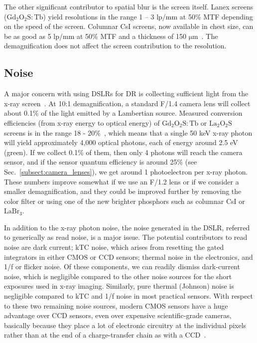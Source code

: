 The other significant contributor to spatial blur is the screen itself. Lanex screens ($\mathrm{Gd_2O_2S:Tb}$) yield resolutions in the range 1 – 3 lp/mm at 50\% MTF depending on the speed of the screen. Columnar CsI screens, now available in chest size, can be as good as 5 lp/mm at 50\% MTF and a thickness of 150 $\mathrm{\mu m}$~\citep{Nagarkar1997}. The demagnification does not affect the screen contribution to the resolution.

\subsection{Noise}
\label{subsect:noise}
A major concern with using DSLRs for DR is collecting sufficient light from the x-ray screen~\citep{Hejazi1997}. At 10:1 demagnification, a standard F/1.4 camera lens will collect about 0.1\% of the light emitted by a Lambertian source. Measured conversion efficiencies (from x-ray energy to optical energy) of $\mathrm{Gd_2O_2S:Tb}$ or $\mathrm{La_2O_2S}$ screens is in the range 18 - 20\%~\citep{Kandarakis2001}, which means that a single 50 keV x-ray photon will yield approximately 4,000 optical photons, each of energy around 2.5 eV (green). If we collect 0.1\% of them, then only 4 photons will reach the camera sensor, and if the sensor quantum efficiency is around 25\% (see Sec.~\ref{subsect:camera_lenses}), we get around 1 photoelectron per x-ray photon. These numbers improve somewhat if we use an F/1.2 lens or if we consider a smaller demagnification, and they could be improved further by removing the color filter or using one of the new brighter phosphors such as columnar CsI or $\mathrm{LaBr_3}$.

In addition to the x-ray photon noise, the noise generated in the DSLR, referred to generically as read noise, is a major issue. The potential contributors to read noise are dark current; kTC noise, which arises from resetting the gated integrators in either CMOS or CCD sensors; thermal noise in the electronics, and 1/f or flicker noise. Of these components, we can readily dismiss dark-current noise, which is negligible compared to the other noise sources for the short exposures used in x-ray imaging. Similarly, pure thermal (Johnson) noise is negligible compared to kTC and 1/f noise in most practical sensors. With respect to these two remaining noise sources, modern CMOS sensors have a huge advantage over CCD sensors, even over expensive scientific-grade cameras, basically because they place a lot of electronic circuitry at the individual pixels rather than at the end of a charge-transfer chain as with a CCD~\citep{Magnan2003}.

